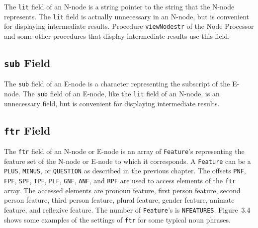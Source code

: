 \documentclass{article}
\begin{document}
The \texttt{lit} field of an N-node is a string pointer to the
string that the N-node represents. The \texttt{lit} field is
actually unnecessary in an N-node, but is convenient for
displaying intermediate results. Procedure \texttt{viewNodestr} of
the Node Processor and some other procedures that display
intermediate results use this field.


\subsection{\textbf{\texttt{sub}} Field}

The \texttt{sub} field of an E-node is a character representing
the subscript of the E-node. The \texttt{sub} field of an
E-node, like the \texttt{lit} field of an N-node, is an
unnecessary field, but is convenient for displaying intermediate
results.


\subsection{\textbf{\texttt{ftr}} Field}

The \texttt{ftr} field of an N-node or E-node is an array of
\texttt{Feature}'s representing the feature set of the N-node or
E-node to which it corresponds. A \texttt{Feature} can be a
\texttt{PLUS}, \texttt{MINUS}, or \texttt{QUESTION} as described
in the previous chapter. The offsets \texttt{PNF}, \texttt{FPF},
\texttt{SPF}, \texttt{TPF}, \texttt{PLF}, \texttt{GNF},
\texttt{ANF}, and \texttt{RPF} are used to access elements of
the \texttt{ftr} array. The accessed elements are pronoun
feature, first person feature, second person feature, third
person feature, plural feature, gender feature, animate feature,
and reflexive feature. The number of \texttt{Feature}'s is
\texttt{NFEATURES}. Figure~3.4 shows some examples of the
settings of \texttt{ftr} for some typical noun phrases.
\end{document}
